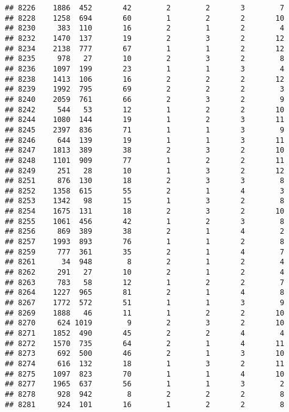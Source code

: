 \documentclass[]{article}
\begin{document}
\begin{verbatim}
## 8226    1886  452       42        2        2       3        7
## 8228    1258  694       60        1        2       2       10
## 8230     383  110       16        2        1       2        4
## 8232    1470  137       19        2        3       2       12
## 8234    2138  777       67        1        1       2       12
## 8235     978   27       10        2        3       2        8
## 8236    1097  199       23        1        1       3        4
## 8238    1413  106       16        2        2       2       12
## 8239    1992  795       69        2        2       2        3
## 8240    2059  761       66        2        3       2        9
## 8242     544   53       12        1        2       2       10
## 8244    1080  144       19        1        2       3       11
## 8245    2397  836       71        1        1       3        9
## 8246     644  139       19        1        1       3       11
## 8247    1813  389       38        2        3       2       10
## 8248    1101  909       77        1        2       2       11
## 8249     251   28       10        1        3       2       12
## 8251     876  130       18        2        3       3        8
## 8252    1358  615       55        2        1       4        3
## 8253    1342   98       15        1        3       2        8
## 8254    1675  131       18        2        3       2       10
## 8255    1061  456       42        1        2       3        8
## 8256     869  389       38        2        1       4        2
## 8257    1993  893       76        1        1       2        8
## 8259     777  361       35        2        1       4        7
## 8261      34  948        8        2        1       2        4
## 8262     291   27       10        2        1       2        4
## 8263     783   58       12        1        2       2        7
## 8264    1227  965       81        2        1       4        8
## 8267    1772  572       51        1        1       3        9
## 8269    1888   46       11        1        2       2       10
## 8270     624 1019        9        2        3       2       10
## 8271    1852  490       45        2        2       4        4
## 8272    1570  735       64        2        1       4       11
## 8273     692  500       46        2        1       3       10
## 8274     616  132       18        1        3       2       11
## 8275    1097  823       70        1        1       4       10
## 8277    1965  637       56        1        1       3        2
## 8278     928  942        8        2        2       2        8
## 8281     924  101       16        1        2       2        8

\end{verbatim}
\end{document}
